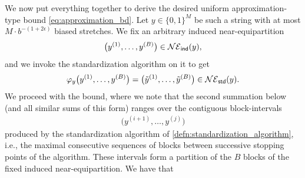 \documentclass[11pt]{amsart}
\numberwithin{equation}{section}
\numberwithin{equation}{section}
\newcommand{\1}{\mathbbm{1}}
\newcommand{\ind}{\textup{\textsf{ind}}}
\newcommand{\std}{\textup{\textsf{std}}}
\theoremstyle{definition}
\begin{document}
We now put everything together to derive the desired uniform approximation-type bound \eqref{eq:approximation_bd}. Let $y \in \{0,1\}^M$ be such a string with at most $M \cdot b^{-(1+2\epsilon)}$ biased stretches. We fix an arbitrary induced near-equipartition 
\begin{align*}
    \big(y^{(1)}, \dots, y^{(B)}\big) \in \mathcal{NE}_\ind(y),
\end{align*}
and we invoke the standardization algorithm on it to get
\begin{align*}
    \varphi_y\big(y^{(1)}, \dots, y^{(B)}\big) = \big(\tilde{y}^{(1)}, \dots, \tilde{y}^{(B)}\big) \in \mathcal{NE}_\std(y).
\end{align*}
We proceed with the bound, where we note that the second summation below (and all similar sums of this form) ranges over the contiguous block-intervals
\begin{align*}
    \big(y^{(i+1)},\ldots,y^{(j)}\big)
\end{align*}
produced by the standardization algorithm of \cref{defn:standardization_algorithm}, i.e., the maximal consecutive sequences of blocks between successive stopping points of the algorithm. These intervals form a partition of the $B$ blocks of the fixed induced near-equipartition. We have that 
\end{document}
